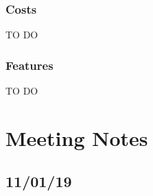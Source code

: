 \documentclass[11pt,a4paper]{report}
\begin{document}
\subsection{Costs}
\label{subsec:costs}

TO DO


\subsection{Features}
\label{subsec:features}

TO DO


\chapter{Meeting Notes}

\section{11/01/19}
\end{document}
